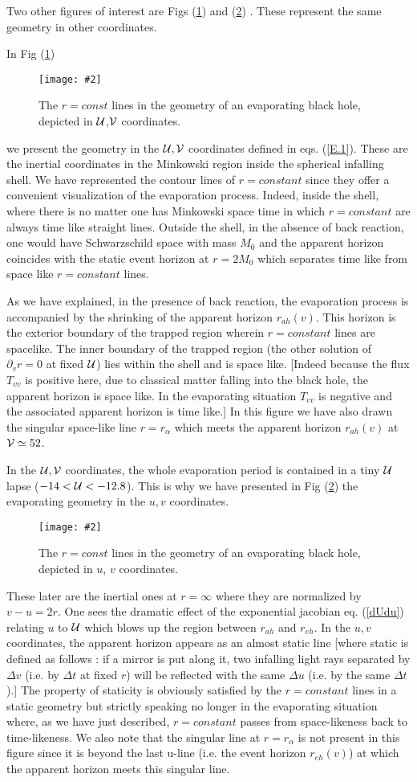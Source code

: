 \documentclass[12pt,oneside]{report}
\newcommand{\dessin}[4]
{\begin{figure}[tp]\begin{center}
\texttt{[image: \#2]}%
\end{center}
\caption{#4}
\label{#3}
\end{figure}}
\begin{document}
Two other figures of interest are Figs (\ref{PP1}) and (\ref{PP2}) . These
represent the same geometry in other coordinates.
 

In Fig (\ref{PP1}) 
\dessin{1.000}{NFIG3-9.eps}{PP1}{The $r=const$ lines in the geometry of an
evaporating black hole, depicted in ${\cal U}$,${ \cal V}$ coordinates.} 
we present
the geometry in the $\cal U, \cal V$ coordinates defined in eqs. (\ref{E.1}). 
These are the inertial coordinates in the Minkowski region
inside
the spherical infalling shell. We have represented the 
contour lines of $r=constant$ since they offer 
a convenient visualization of the evaporation 
process. 
Indeed, inside the shell, where there is no
matter  one has Minkowski space time in which $r=constant$ are
always time like straight lines. 
Outside the shell, in the absence of back reaction, one
would have  
Schwarzschild space with mass $M_0$ and  
the apparent horizon coincides with the static
event horizon at $r=2M_0$ which separates time like from space like
$r=constant$ lines.

As we have explained,
in the presence of back reaction, the evaporation process is accompanied by
the shrinking of the apparent horizon $r_{ah}(v)$. 
This horizon is the 
exterior boundary of the trapped region wherein $r=constant$ lines are
spacelike. The inner boundary of the trapped region (the other solution of
$\partial_v r =0$ at fixed ${\cal U}$) lies within the shell and is space like.
[Indeed because the flux $T_{vv}$ is positive here, due to classical matter
falling into  the black hole,
the apparent horizon is space like. In the evaporating situation $T_{vv}$ is
negative and the associated apparent horizon is time like.]
In this figure  we have also drawn the singular space-like line $r=r_{\alpha}$
which meets the apparent horizon $r_{ah}(v)$ at ${\cal {V}}\simeq 52$.

In the $\cal U, \cal V$ coordinates, the whole evaporation period is contained
in a tiny $\cal U $ lapse ($-14 < {\cal U} < -12.8$). 
This is why we have presented in Fig (\ref{PP2}) 
the evaporating geometry in the
$u,v$ coordinates. 
\dessin{1.000}{NFIG3-10.eps}{PP2}{The $r=const$ lines in the geometry of an
evaporating black hole, depicted in $u$, $v$ coordinates. }
These later are the inertial ones at $r=\infty$ where
they are normalized by $v-u = 2r$. One sees the dramatic 
effect of the exponential jacobian eq. (\ref{dUdu})
relating $u$ to $\cal U$ which blows up the region between $r_{ah}$ and
$r_{eh}$. In the $u,v$ coordinates, the apparent horizon appears as an
almost static
line
[where static is defined as 
follows : if a mirror is put along
it, two infalling light rays separated 
by $\Delta v$ (i.e. by $\Delta t$ at fixed $r$)
will be reflected with the same $\Delta u$ (i.e. 
by the same $\Delta t$).] The property
of staticity is obviously satisfied by the $r=constant$ lines in a 
static geometry but strictly speaking no longer
in the evaporating situation where, as we have just described,
 $r=constant$  
passes from space-likeness back to
time-likeness. 
We also note that the  singular line at $r=r_{\alpha}$ 
is not present in this figure since
it is beyond the last u-line (i.e. the event horizon $r_{eh}(v)$) at 
which the 
apparent horizon meets this
singular line.
\end{document}
